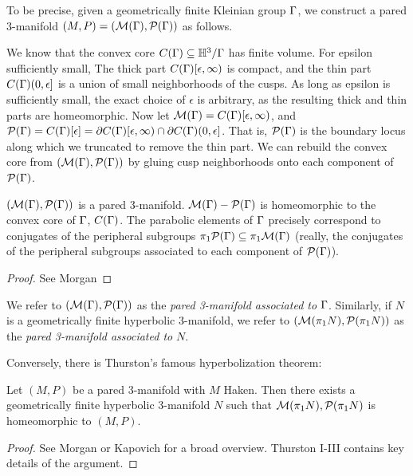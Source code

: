 To be precise, given a geometrically finite Kleinian group $\Gamma$, we construct
a pared 3-manifold $(M,P)=(\mathcal{M}(\Gamma),\mathcal{P}(\Gamma))$ as follows.

We know that the convex core $C(\Gamma) \subseteq \mathbb{H}^3/\Gamma$ has finite volume. For
epsilon sufficiently small, The thick part $C(\Gamma)[\epsilon,\infty)$ is
compact, and the thin part $C(\Gamma)(0,\epsilon]$ is a union of small
neighborhoods of the cusps.  As long as epsilon is sufficiently small, the
exact choice of $\epsilon$ is arbitrary, as the resulting thick and thin parts
are homeomorphic.  Now let $\mathcal{M}(\Gamma) = C(\Gamma)[\epsilon,\infty)$, and $\mathcal{P}(\Gamma)
= C(\Gamma)[\epsilon] = \partial C(\Gamma)[\epsilon,\infty) \cap \partial C(\Gamma)(0,\epsilon]$.
That is, $\mathcal{P}(\Gamma)$ is the boundary locus along which we truncated to remove
the thin part. We can rebuild the convex core from $(\mathcal{M}(\Gamma),\mathcal{P}(\Gamma))$ by
gluing cusp neighborhoods onto each component of $\mathcal{P}(\Gamma)$.

\begin{prop}

$(\mathcal{M}(\Gamma),\mathcal{P}(\Gamma))$ is a pared 3-manifold. $\mathcal{M}(\Gamma)- \mathcal{P}(\Gamma)$ is
homeomorphic to the convex core of $\Gamma$, $C(\Gamma)$. The parabolic elements of
$\Gamma$ precisely correspond to conjugates of the peripheral subgroups
$\pi_1\mathcal{P}(\Gamma) \subseteq \pi_1\mathcal{M}(\Gamma)$ (really, the conjugates of the peripheral
subgroups associated to each component of $\mathcal{P}(\Gamma)$).

\end{prop}

\begin{proof}

See Morgan %

\end{proof}

We refer to $(\mathcal{M}(\Gamma),\mathcal{P}(\Gamma))$ as the \emph{pared 3-manifold associated to}
$\Gamma$.  Similarly, if $N$ is a geometrically finite hyperbolic 3-manifold, we
refer to $(\mathcal{M}(\pi_1N),\mathcal{P}(\pi_1N))$ as the \emph{pared 3-manifold associated
to} $N$.

Conversely, there is Thurston's famous hyperbolization theorem:

\begin{thm}

Let $(M,P)$ be a pared 3-manifold with $M$ Haken. Then there exists
a geometrically finite hyperbolic 3-manifold $N$ such that
$\mathcal{M}(\pi_1N),\mathcal{P}(\pi_1N)$ is homeomorphic to $(M,P)$.

\end{thm}

\begin{proof}

See Morgan or Kapovich for a broad overview. Thurston I-III contains key
details of the argument.

\end{proof}

